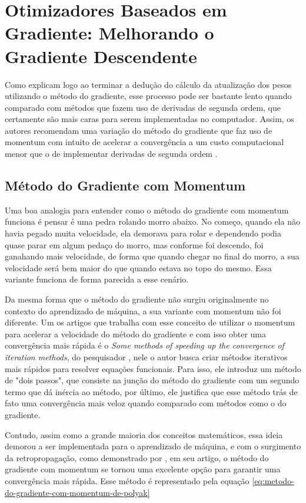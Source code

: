 \section{Otimizadores Baseados em Gradiente: Melhorando o Gradiente Descendente}

Como \textcite{BackpropagationArticle} explicam logo ao terminar a dedução do cálculo da atualização dos pesos utilizando o método do gradiente, esse processo pode ser bastante lento quando comparado com métodos que fazem uso de derivadas de segunda ordem, que certamente são mais caras para serem implementadas no computador. Assim, os autores recomendam uma variação do método do gradiente que faz uso de momentum com intuito de acelerar a convergência a um custo computacional menor que o de implementar derivadas de segunda ordem \parencite{BackpropagationArticle}.

\subsection{Método do Gradiente com Momentum}

Uma boa analogia para entender como o método do gradiente com momentum funciona é pensar é uma pedra rolando morro abaixo. No começo, quando ela não havia pegado muita velocidade, ela demorava para rolar e dependendo podia quase parar em algum pedaço do morro, mas conforme foi descendo, foi ganahando mais velocidade, de forma que quando chegar no final do morro, a sua velocidade será bem maior do que quando estava no topo do mesmo. Essa variante funciona de forma parecida a esse cenário.

Da mesma forma que o método do gradiente não surgiu originalmente no contexto do aprendizado de máquina, a sua variante com momentum não foi diferente. Um os artigos que trabalha com esse conceito de utilizar o momentum para acelerar a velocidade do método do gradiente e com isso obter uma convergência mais rápida é o \textit{Some methods of speeding up the convergence of iteration methods}, do pesquisador \textcite{polyak1964}, nele o autor busca criar métodos iterativos mais rápidos para resolver equações funcionais. Para isso, ele introduz um método de "dois passos", que consiste na junção do método do gradiente com um segundo termo que dá inércia ao método, por último, ele justifica que esse método trás de fato uma convergência mais veloz quando comparado com métodos como o do gradiente.

Contudo, assim como a grande maioria dos conceitos matemáticos, essa ideia demorou a ser implementada para o aprendizado de máquina, e com o surgimento da retropropagação, como demonstrado por \parencite{BackpropagationArticle}, em seu artigo, o método do gradiente com momentum se tornou uma excelente opção para garantir uma convergência mais rápida. Esse método é representado pela equação \ref{eq:metodo-do-gradiente-com-momentum-de-polyak}

